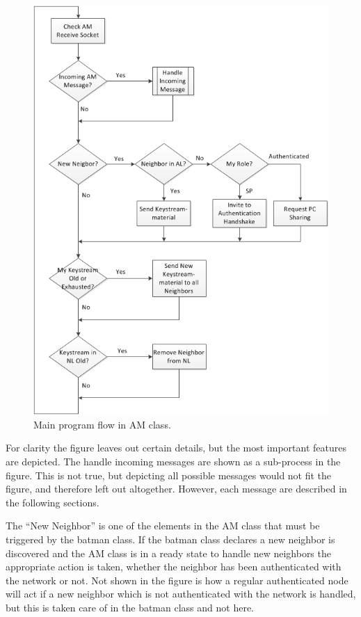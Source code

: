 \begin{figure}[H]
	\centering
	\includegraphics[width=\textwidth]{images/am_main_loop.png}
	\caption{Main program flow in AM class.}
	\label{fig:am_main_loop}
\end{figure}

For clarity the figure leaves out certain details, but the most important
features are depicted. The handle incoming messages are shown as a sub-process
in the figure.  This is not true, but depicting all possible messages would not
fit the figure, and therefore left out altogether. However, each message are
described in the following sections.

The ``New Neighbor'' is one of the elements in the AM class that must be
triggered by the batman class. If the batman class declares a new neighbor is
discovered and the AM class is in a ready state to handle new neighbors the
appropriate action is taken, whether the neighbor has been authenticated with
the network or not. Not shown in the figure is how a regular authenticated node
will act if a new neighbor which is not authenticated with the network is
handled, but this is taken care of in the batman class and not here.

